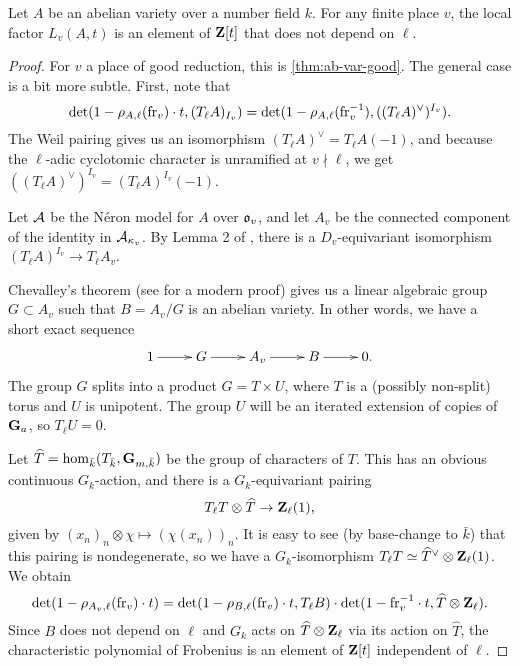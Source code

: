 \begin{theorem}
Let $A$ be an abelian variety over a number field $k$. For any finite place 
$v$, the local factor $L_v(A,t)$ is an element of $\mathbf{Z}[t]$ that does not depend 
on $\ell$. 
\end{theorem}
\begin{proof}
For $v$ a place of good reduction, this is \autoref{thm:ab-var-good}. The 
general case is a bit more subtle. First, note that 
\[
  \det(1-\rho_{A,\ell}(\mathrm{fr}_v)\cdot t,(T_\ell A)_{I_v}) 
    = \det(1-\rho_{A,\ell}(\mathrm{fr}_v^{-1}),((T_\ell A)^\vee)^{I_v}) \text{.}
\]
The Weil pairing gives us an isomorphism $(T_\ell A)^\vee= T_\ell A(-1)$, 
and because the $\ell$-adic cyclotomic character is unramified at 
$v\nmid \ell$, we get $((T_\ell A)^\vee)^{I_v} = (T_\ell A)^{I_v}(-1)$. 

Let $\mathcal{A}$ be the N\'eron model for $A$ over 
$\mathfrak{o}_v$, and let $A_v$ be the connected component of the identity in 
$\mathcal{A}_{\kappa_v}$. By Lemma 2 of \cite{st68}, there is a $D_v$-equivariant 
isomorphism $(T_\ell A)^{I_v} \to T_\ell A_v$. 

Chevalley's theorem (see \cite{co02} for a modern proof) gives us a linear 
algebraic group $G\subset A_v$ such that $B=A_v/G$ is an abelian variety. In 
other words, we have a short exact sequence 
\[\xymatrix{
  1 \ar[r] 
    & G \ar[r] 
    & A_v \ar[r] 
    & B \ar[r] 
    & 0 \text{.} 
}\]
The group $G$ splits into a product $G=T\times U$, where $T$ is a (possibly 
non-split) torus and $U$ is unipotent. The group $U$ will be an iterated 
extension of copies of $\mathbf{G}_a$, so $T_\ell U=0$. 

Let $\widehat T=\hom_{\bar k}(T_{\bar k},\mathbf{G}_{m,\bar k})$ be the group of 
characters of $T$. This has an obvious continuous $G_k$-action, and there is a 
$G_k$-equivariant pairing 
\[
  T_\ell T \otimes \widehat T \to \mathbf{Z}_\ell(1) \text{,}
\]
given by $(x_n)_n\otimes \chi \mapsto (\chi(x_n))_n$. It is easy to see (by 
base-change to $\bar k$) that this pairing is nondegenerate, so we have a 
$G_k$-isomorphism $T_\ell T \simeq \widehat T^\vee \otimes \mathbf{Z}_\ell(1)$. 
We obtain 
\[
  \det(1-\rho_{A_v,\ell}(\mathrm{fr}_v)\cdot t) = \det(1-\rho_{B,\ell}(\mathrm{fr}_v)\cdot t,T_\ell B) \cdot \det(1-\mathrm{fr}_v^{-1}\cdot t,\widehat T\otimes \mathbf{Z}_\ell) \text{.}
\]
Since $B$ does not depend on $\ell$ and $G_k$ acts on 
$\widehat T\otimes \mathbf{Z}_\ell$ via its action on $\widehat T$, the characteristic 
polynomial of Frobenius is an element of $\mathbf{Z}[t]$ independent of $\ell$. 
\end{proof}

